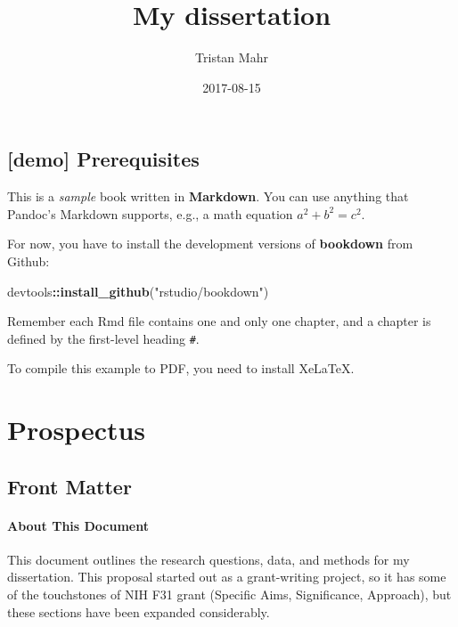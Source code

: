 \documentclass[]{book}
\title{My dissertation}
\author{Tristan Mahr}
\date{2017-08-15}
\newenvironment{Shaded}{\begin{snugshade}}{\end{snugshade}}
\newcommand{\KeywordTok}[1]{\textcolor[rgb]{0.13,0.29,0.53}{\textbf{#1}}}
\newcommand{\StringTok}[1]{\textcolor[rgb]{0.31,0.60,0.02}{#1}}
\newcommand{\OperatorTok}[1]{\textcolor[rgb]{0.81,0.36,0.00}{\textbf{#1}}}
\newcommand{\NormalTok}[1]{#1}
\theoremstyle{definition}
\theoremstyle{definition}
\theoremstyle{remark}
\begin{document}
\maketitle

{
\setcounter{tocdepth}{1}
\tableofcontents
}
\chapter{{[}demo{]} Prerequisites}\label{demo-prerequisites}

This is a \emph{sample} book written in \textbf{Markdown}. You can use
anything that Pandoc's Markdown supports, e.g., a math equation
\(a^2 + b^2 = c^2\).

For now, you have to install the development versions of
\textbf{bookdown} from Github:

\begin{Shaded}
\begin{Highlighting}[]
\NormalTok{devtools}\OperatorTok{::}\KeywordTok{install_github}\NormalTok{(}\StringTok{"rstudio/bookdown"}\NormalTok{)}
\end{Highlighting}
\end{Shaded}

Remember each Rmd file contains one and only one chapter, and a chapter
is defined by the first-level heading \texttt{\#}.

To compile this example to PDF, you need to install XeLaTeX.

\part*{Prospectus}\label{part-prospectus}

\chapter{Front Matter}\label{front-matter}

\subsection*{About This Document}\label{about-this-document}

This document outlines the research questions, data, and methods for my
dissertation. This proposal started out as a grant-writing project, so
it has some of the touchstones of NIH F31 grant (Specific Aims,
Significance, Approach), but these sections have been expanded
considerably.
\end{document}
